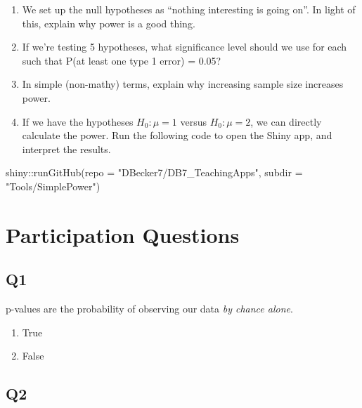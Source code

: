 \documentclass[
  letterpaper,
  DIV=11,
  numbers=noendperiod,
  oneside]{scrreprt}
\newenvironment{Shaded}{\begin{snugshade}}{\end{snugshade}}
\newcommand{\AttributeTok}[1]{\textcolor[rgb]{0.40,0.45,0.13}{#1}}
\newcommand{\FunctionTok}[1]{\textcolor[rgb]{0.28,0.35,0.67}{#1}}
\newcommand{\NormalTok}[1]{\textcolor[rgb]{0.00,0.23,0.31}{#1}}
\newcommand{\SpecialCharTok}[1]{\textcolor[rgb]{0.37,0.37,0.37}{#1}}
\newcommand{\StringTok}[1]{\textcolor[rgb]{0.13,0.47,0.30}{#1}}
\providecommand{\tightlist}{%
  \setlength{\itemsep}{0pt}\setlength{\parskip}{0pt}}\usepackage{longtable,booktabs,array}
\begin{document}
\begin{enumerate}
\def\labelenumi{\arabic{enumi}.}
\tightlist
\item
  We set up the null hypotheses as ``nothing interesting is going on''.
  In light of this, explain why power is a good thing.
\item
  If we're testing 5 hypotheses, what significance level should we use
  for each such that P(at least one type 1 error) = 0.05?
\item
  In simple (non-mathy) terms, explain why increasing sample size
  increases power.
\item
  If we have the hypotheses \(H_0:\mu = 1\) versus \(H_0:\mu = 2\), we
  can directly calculate the power. Run the following code to open the
  Shiny app, and interpret the results.
\end{enumerate}

\begin{Shaded}
\begin{Highlighting}[]
\NormalTok{shiny}\SpecialCharTok{::}\FunctionTok{runGitHub}\NormalTok{(}\AttributeTok{repo =} \StringTok{"DBecker7/DB7\_TeachingApps"}\NormalTok{, }
    \AttributeTok{subdir =} \StringTok{"Tools/SimplePower"}\NormalTok{)}
\end{Highlighting}
\end{Shaded}

\hypertarget{participation-questions}{%
\section{Participation Questions}\label{participation-questions}}

\hypertarget{q1}{%
\subsection{Q1}\label{q1}}

p-values are the probability of observing our data \emph{by chance
alone}.

\pspace

\begin{enumerate}
\def\labelenumi{\arabic{enumi}.}
\tightlist
\item
  True
\item
  False
\end{enumerate}

\hypertarget{q2}{%
\subsection{Q2}\label{q2}}
\end{document}
